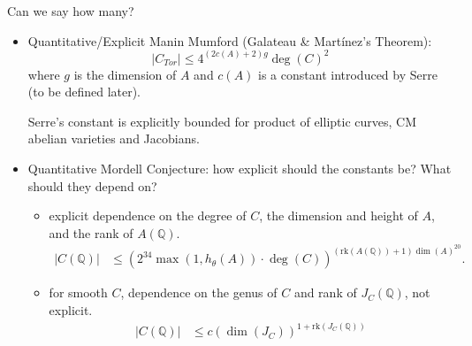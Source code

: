 \documentclass[handout]{beamer}
\begin{document}
\begin{frame}{Can we say how many?}
\vspace{-0.3cm}
\begin{tcolorbox}\begin{itemize} \item Quantitative/Explicit  Manin Mumford (Galateau \& Martínez's Theorem): 
$$ \lvert C_{Tor} \rvert \le 4^{(2c(A)+2)g} \deg(C)^2$$ where $g$ is the dimension of $A$ and $c(A)$ is a constant introduced by Serre (to be defined later).
 
 Serre's constant is  explicitly bounded for product of elliptic curves, CM abelian varieties and Jacobians.

\vspace{0.2cm}
\pause

 \item Quantitative Mordell Conjecture: how explicit should the constants be? What should they depend on?  
	\begin{itemize}
		\item explicit dependence on the degree of $C$, the dimension and height of $A$, and the rank of $A(\mathbb{Q})$.
		\begin{align}
			\lvert C(\mathbb{Q}) \rvert &\leq (2^{34} \max(1,h_\theta(A)) \cdot \deg(C))^{(\mathrm{rk}(A(\mathbb{Q}))+1) \dim(A)^{20}}. \tag{Rémond + David-Philippon}
		\end{align}
		\item for smooth $C$, dependence on the genus of $C$ and rank of $J_C(\mathbb{Q})$, not explicit.
		\begin{align}
			\lvert C(\mathbb{Q}) \rvert &\leq c(\dim(J_C))^{1 + \mathrm{rk}(J_C(\mathbb{Q}))} \tag{Dimitrov, Gao, Habegger}
		\end{align}
	\end{itemize}
\end{itemize}
\end{tcolorbox}


\end{frame}
\end{document}
